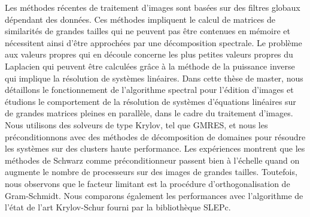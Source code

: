 Les méthodes récentes de traitement d'images sont basées sur des filtres globaux dépendant des données.
Ces méthodes impliquent le calcul de matrices de similarités de grandes tailles qui ne peuvent pas être contenues en mémoire et nécessitent ainsi d'être approchées par une décomposition spectrale.
Le problème aux valeurs propres qui en découle concerne les plus petites valeurs propres du Laplacien qui peuvent être calculées grâce à la méthode de la puissance inverse qui implique la résolution de systèmes linéaires.
Dans cette thèse de master, nous détaillons le fonctionnement de l'algorithme spectral pour l'édition d'images et étudions le comportement de la résolution de systèmes d'équations linéaires sur de grandes matrices pleines en parallèle, dans le cadre du traitement d'images.
Nous utilisons des solveurs de type Krylov, tel que GMRES, et nous les préconditionnons avec des méthodes de décomposition de domaines pour résoudre les systèmes sur des clusters haute performance.
Les expériences montrent que les méthodes de Schwarz comme préconditionneur passent bien à l'échelle quand on augmente le nombre de processeurs sur des images de grandes tailles.
Toutefois, nous observons que le facteur limitant est la procédure d'orthogonalisation de Gram-Schmidt.
Nous comparons également les performances avec l'algorithme de l'état de l'art Krylov-Schur fourni par la bibliothèque SLEPc.
